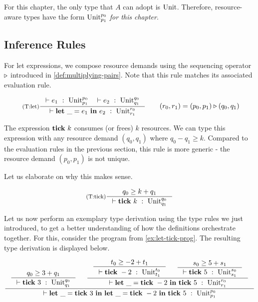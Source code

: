 For this chapter, the only type that \(A\) can adopt is \(\text{Unit}\). Therefore, resource-aware types have the form \(\text{Unit} ^{p_0}_{p_1}\) \emph{for this chapter}.

\subsection{Inference Rules}

For let expressions, we compose resource demands using the sequencing operator \(\triangleright\) introduced in \cref{def:multiplying-pairs}. Note that this rule matches its associated evaluation rule.

\[
   \label{def:tr-let-4}
   \vcenter{\hbox{
      \inference[(T:let)]
      {\typing{}{e_1}{\ratype{\unit}{p_0}{p_1}} \quad \typing{}{e_2}{\ratype{\unit}{q_0}{q_1}}}
      {\typing{}{\letexp{\_}{e_1}{e_2}}{\ratype{\unit}{r_0}{r_1}}}
}}\qquad \begin{aligned}
      (r_0, r_1) = (p_0, p_1) \sequence (q_0, q_1)
   \end{aligned}
\]

The expression \(\mathbf{tick}~k\) consumes (or frees) \(k\) resources. We can type this expression with any resource demand \((q_0, q_1)\) where \(q_0 - q_1 \geq k\). Compared to the evaluation rules in the previous section, this rule is more generic - the resource demand \((p_0, p_1)\) is not unique.

Let us elaborate on why this makes sense. 

\[
   \label{def:tr-tick-4}
   \inference[(T:tick)]
   {q_0 \geq k + q_1}
   {\typing{}{\tick{k}}{\ratype{\unit}{q_0}{q_1}}}
\]


Let us now perform an exemplary type derivation using the type rules we just introduced, to get a better understanding of how the definitions orchestrate together. For this, consider the program from \cref{ex:let-tick-prog}. The resulting type derivation is displayed below.

\[
   \inference
   {
      \inference
      {q_0 \geq 3 + q_1}
      {\typing{}{\tick{3}}{\ratype{\unit}{q_0}{q_1}}}
       &
      \inference
      {
         \inference
         {t_0 \geq -2 + t_1}
         {\typing{}{\tick{-2}}{\ratype{\unit}{t_0}{t_1}}}
          &
         \inference
         {s_0 \geq 5 + s_1}
         {\typing{}{\tick{5}}{\ratype{\unit}{s_0}{s_1}}}
      }
      {\typing{}{\letexp{\_}{\tick{-2}}{\tick{5}}}{\ratype{\unit}{r_0}{r_1}}}
   }
   {\typing{}{\letexp{\_}{\tick{3}}{\letexp{\_}{\tick{-2}}{\tick{5}}}}{\ratype{\unit}{p_0}{p_1}}}
\]

